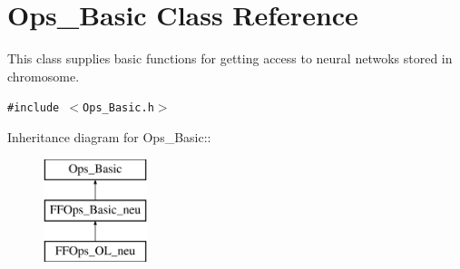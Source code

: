 \section{Ops\_\-Basic Class Reference}
\label{classOps__Basic}
This class supplies basic functions for getting access to neural netwoks stored in chromosome. 


{\tt \#include $<$Ops\_\-Basic.h$>$}

Inheritance diagram for Ops\_\-Basic::\begin{figure}[H]
\begin{center}
\leavevmode
\includegraphics[height=3cm]{classOps__Basic}
\end{center}
\end{figure}
